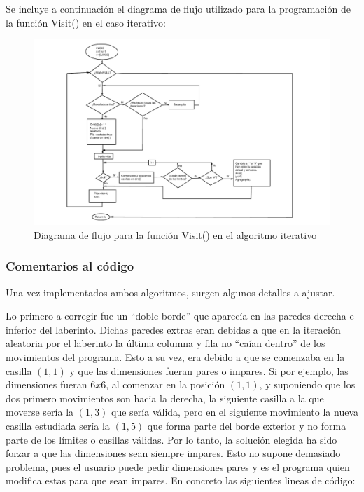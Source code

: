 \documentclass[12pt,a4paper]{article}
\begin{document}
Se incluye a continuación el diagrama de flujo utilizado para la programación de la función \textsf{Visit()} en el caso iterativo:

\begin{figure}[H]
	\hspace{-4.3cm}
	\includegraphics[scale=1.05]{fotos/diagrama.pdf}
	\caption{Diagrama de flujo para la función \textsf{Visit()} en el algoritmo iterativo}
	\label{diagrama}
\end{figure}

\subsubsection{Comentarios al código}

Una vez implementados ambos algoritmos, surgen algunos detalles a ajustar.

Lo primero a corregir fue un ``doble borde'' que aparecía en las paredes derecha e inferior del laberinto. Dichas paredes extras eran debidas a que en la iteración aleatoria por el laberinto la última columna y fila no ``caían dentro'' de los movimientos del programa. Esto a su vez, era debido a que se comenzaba en la casilla $(1,1)$ y que las dimensiones fueran pares o impares. Si por ejemplo, las dimensiones fueran $6x6$, al comenzar en la posición $(1,1)$, y suponiendo que los dos primero movimientos son hacia la derecha, la siguiente casilla a la que moverse sería la $(1,3)$ que sería válida, pero en el siguiente movimiento la nueva casilla estudiada sería la $(1,5)$ que forma parte del borde exterior y no forma parte de los límites o casillas válidas. Por lo tanto, la solución elegida ha sido forzar a que las dimensiones sean siempre impares. Esto no supone demasiado problema, pues el usuario puede pedir dimensiones pares y es el programa quien modifica estas para que sean impares. En concreto las siguientes lineas de código:
\end{document}
